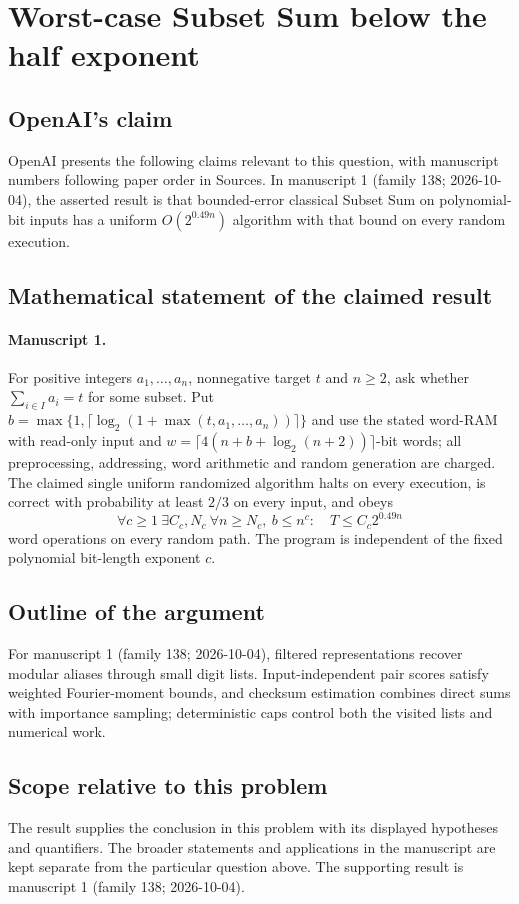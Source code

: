 \documentclass[11pt]{article}
\begin{document}
\section*{Worst-case Subset Sum below the half exponent}

\subsection{OpenAI's claim}
OpenAI presents the following claims relevant to this question, with manuscript numbers following paper order in Sources. In manuscript 1 (family 138; 2026-10-04), the asserted result is that bounded-error classical Subset Sum on polynomial-bit inputs has a uniform $O(2^{0.49n})$ algorithm with that bound on every random execution.

\subsection{Mathematical statement of the claimed result}
\paragraph{Manuscript 1.}
For positive integers $a_1,\ldots,a_n$, nonnegative target $t$ and $n\ge2$, ask whether $\sum_{i\in I}a_i=t$ for some subset. Put $b=\max\{1,\lceil\log_2(1+\max(t,a_1,\ldots,a_n))\rceil\}$ and use the stated word-RAM with read-only input and $w=\lceil4(n+b+\log_2(n+2))\rceil$-bit words; all preprocessing, addressing, word arithmetic and random generation are charged. The claimed single uniform randomized algorithm halts on every execution, is correct with probability at least $2/3$ on every input, and obeys
\[
 \forall c\ge1\ \exists C_c,N_c\ \forall n\ge N_c,\ b\le n^c:
 \quad T\le C_c2^{0.49n}
\]
word operations on every random path. The program is independent of the fixed polynomial bit-length exponent $c$.

\subsection{Outline of the argument}
For manuscript 1 (family 138; 2026-10-04), filtered representations recover modular aliases through small digit lists. Input-independent pair scores satisfy weighted Fourier-moment bounds, and checksum estimation combines direct sums with importance sampling; deterministic caps control both the visited lists and numerical work.

\subsection{Scope relative to this problem}
The result supplies the conclusion in this problem with its displayed hypotheses and quantifiers. The broader statements and applications in the manuscript are kept separate from the particular question above. The supporting result is manuscript 1 (family 138; 2026-10-04).
\end{document}
